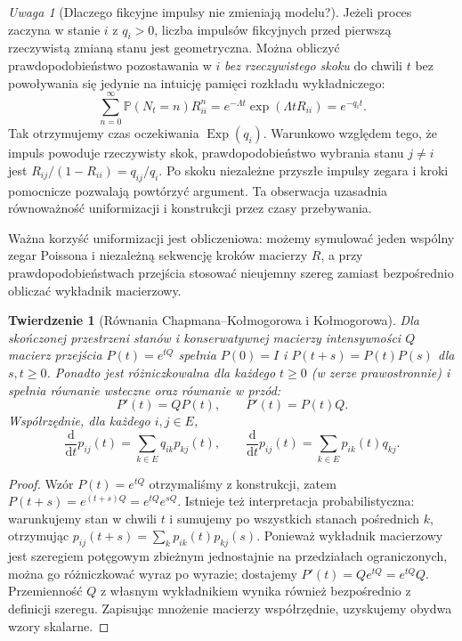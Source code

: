 \documentclass[11pt,a4paper,oneside]{report}
\numberwithin{equation}{chapter}
\theoremstyle{plain}
\newtheorem{twierdzenie}{Twierdzenie}[chapter]
\theoremstyle{definition}
\theoremstyle{remark}
\newtheorem{uwaga}{Uwaga}[chapter]
\newcommand{\Prob}{\mathbb{P}}
\newcommand{\dd}{\mathrm{d}}
\begin{document}
\begin{uwaga}[Dlaczego fikcyjne impulsy nie zmieniają modelu?]
Jeżeli proces zaczyna w stanie $i$ z $q_i>0$,
liczba impulsów fikcyjnych przed pierwszą rzeczywistą
zmianą stanu jest geometryczna. Można obliczyć
prawdopodobieństwo pozostawania w $i$ \emph{bez
rzeczywistego skoku} do chwili $t$ bez powoływania się
jedynie na intuicję pamięci rozkładu wykładniczego:
\[
\sum_{n=0}^\infty\Prob(N_t=n)R_{ii}^{n}
=e^{-\Lambda t}\exp(\Lambda tR_{ii})
=e^{-q_it}.
\]
Tak otrzymujemy czas oczekiwania $\operatorname{Exp}(q_i)$.
Warunkowo względem tego, że impuls powoduje rzeczywisty skok,
prawdopodobieństwo wybrania stanu $j\ne i$ jest
$R_{ij}/(1-R_{ii})=q_{ij}/q_i$.
Po skoku niezależne przyszłe impulsy zegara i kroki pomocnicze
pozwalają powtórzyć argument. Ta obserwacja uzasadnia
równoważność uniformizacji i konstrukcji przez czasy przebywania.
\end{uwaga}

Ważna korzyść uniformizacji jest obliczeniowa: możemy
symulować jeden wspólny zegar Poissona i niezależną sekwencję
kroków macierzy $R$, a przy prawdopodobieństwach przejścia
stosować nieujemny szereg zamiast bezpośrednio obliczać
wykładnik macierzowy.

\begin{twierdzenie}[Równania Chapmana--Kołmogorowa i Kołmogorowa]
\label{thm:kolmogorov-eq}
Dla skończonej przestrzeni stanów i konserwatywnej macierzy
intensywności $Q$ macierz przejścia $P(t)=e^{tQ}$ spełnia
$P(0)=I$ i $P(t+s)=P(t)P(s)$ dla $s,t\ge0$. Ponadto
jest różniczkowalna dla każdego $t\ge0$ (w zerze prawostronnie)
i spełnia \emph{równanie wsteczne} oraz \emph{równanie w przód}:
\[
P'(t)=QP(t),\qquad P'(t)=P(t)Q.
\]
Współrzędnie, dla każdego $i,j\in E$,
\[
\frac{\dd}{\dd t}p_{ij}(t)=\sum_{k\in E}q_{ik}p_{kj}(t),
\qquad
\frac{\dd}{\dd t}p_{ij}(t)=\sum_{k\in E}p_{ik}(t)q_{kj}.
\]
\end{twierdzenie}
\begin{proof}
Wzór $P(t)=e^{tQ}$ otrzymaliśmy z konstrukcji, zatem
$P(t+s)=e^{(t+s)Q}=e^{tQ}e^{sQ}$.
Istnieje też interpretacja probabilistyczna: warunkujemy
stan w chwili $t$ i sumujemy po wszystkich stanach
pośrednich $k$, otrzymując
$p_{ij}(t+s)=\sum_kp_{ik}(t)p_{kj}(s)$.
Ponieważ wykładnik macierzowy jest szeregiem potęgowym
zbieżnym jednostajnie na przedziałach ograniczonych,
można go różniczkować wyraz po wyrazie; dostajemy
$P'(t)=Qe^{tQ}=e^{tQ}Q$.
Przemienność $Q$ z własnym wykładnikiem wynika również
bezpośrednio z definicji szeregu.
Zapisując mnożenie macierzy współrzędnie, uzyskujemy
obydwa wzory skalarne.
\end{proof}
\end{document}
